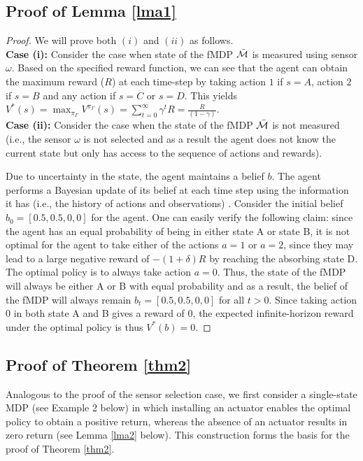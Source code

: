 \documentclass[twocolumn]{autart}    %
\begin{document}
\subsection{Proof of Lemma \ref{lma1}}
\begin{proof}
 We will prove both $(i)$ and $(ii)$ as follows. \\
\textbf{Case (i): } Consider the case when state of the fMDP $\Bar{\mathcal{M}}$ is measured using sensor $\omega$. Based on the specified reward function, we can see that the agent can obtain the maximum reward ($R$) at each time-step by taking action $1$ if $s=A$, action $2$ if $s=B$ and any action if $s = C$ or $s=D$. This yields $ V^*(s) = \max_{\pi_\Gamma} V^{\pi_\Gamma}(s) = \sum_{t = 0}^{\infty} \gamma^t R = \frac{ R}{(1-\gamma)}$.  \\
\textbf{Case (ii): } Consider the case when the state of the fMDP $\Bar{\mathcal{M}}$ is not measured (i.e., the sensor $\omega$ is not selected and as a result the agent does not know the current state but only has access to the sequence of actions and rewards).

Due to uncertainty in the state, the agent maintains a belief $b$. The agent performs a Bayesian update of its belief at each time step using the information it has (i.e., the history of actions and observations) \cite{pineau2003point}.  Consider the initial belief $b_0 = [0.5,0.5,0,0]$ for the agent. One can easily verify the following claim: since the agent has an equal probability of being in either state A or state B, it is not optimal for the agent to take either of the actions $a = 1$ or $a = 2$, since they may lead to a large negative reward of $- (1+\delta)R$ by reaching the absorbing state D. The optimal policy is to always take action $a = 0$. Thus, the state of the fMDP will always be either A or B with equal probability and as a result, the belief of the fMDP will always remain $b_t = [0.5,0.5,0,0] $ for all $t>0$. Since taking action $0$ in both state A and B gives a reward of $0$, the expected infinite-horizon reward under the optimal policy is thus
    $V^*(b) = 0$.
\end{proof}



\subsection{Proof of Theorem \ref{thm2}}
Analogous to the proof of the sensor selection case, we first consider a single-state MDP (see Example 2 below) in which installing an actuator enables the optimal policy to obtain a positive return, whereas the absence of an actuator results in zero return (see Lemma \ref{lma2} below). This construction forms the basis for the proof of Theorem \ref{thm2}.
 
\end{document}
